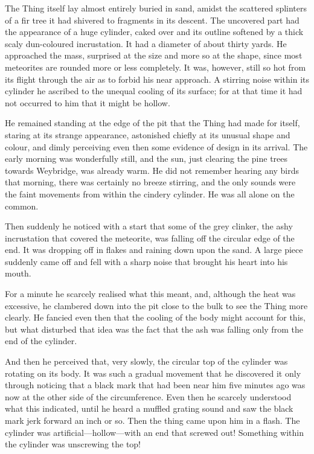 The Thing itself lay almost entirely buried in sand, amidst the scattered splinters of a fir tree it had shivered to fragments in its descent. The uncovered part had the appearance of a huge cylinder, caked over and its outline softened by a thick scaly dun-coloured incrustation. It had a diameter of about thirty yards. He approached the mass, surprised at the size and more so at the shape, since most meteorites are rounded more or less completely. It was, however, still so hot from its flight through the air as to forbid his near approach. A stirring noise within its cylinder he ascribed to the unequal cooling of its surface; for at that time it had not occurred to him that it might be hollow.

He remained standing at the edge of the pit that the Thing had made for itself, staring at its strange appearance, astonished chiefly at its unusual shape and colour, and dimly perceiving even then some evidence of design in its arrival. The early morning was wonderfully still, and the sun, just clearing the pine trees towards Weybridge, was already warm. He did not remember hearing any birds that morning, there was certainly no breeze stirring, and the only sounds were the faint movements from within the cindery cylinder. He was all alone on the common.

Then suddenly he noticed with a start that some of the grey clinker, the ashy incrustation that covered the meteorite, was falling off the circular edge of the end. It was dropping off in flakes and raining down upon the sand. A large piece suddenly came off and fell with a sharp noise that brought his heart into his mouth.

For a minute he scarcely realised what this meant, and, although the heat was excessive, he clambered down into the pit close to the bulk to see the Thing more clearly. He fancied even then that the cooling of the body might account for this, but what disturbed that idea was the fact that the ash was falling only from the end of the cylinder.

And then he perceived that, very slowly, the circular top of the cylinder was rotating on its body. It was such a gradual movement that he discovered it only through noticing that a black mark that had been near him five minutes ago was now at the other side of the circumference. Even then he scarcely understood what this indicated, until he heard a muffled grating sound and saw the black mark jerk forward an inch or so. Then the thing came upon him in a flash. The cylinder was artificial—hollow—with an end that screwed out! Something within the cylinder was unscrewing the top!

